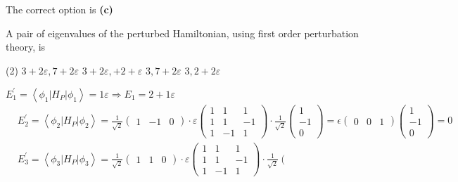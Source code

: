 \begin{enumerate}
\begin{answer}
		The correct option is \textbf{(c)}
	\end{answer}
	\begin{minipage}{\textwidth}
		\item A pair of eigenvalues of the perturbed Hamiltonian, using first order perturbation theory, is
	\end{minipage}
	\begin{tasks}(2)
		\task[\textbf{A.}]$3+2 \varepsilon, 7+2 \varepsilon$
		\task[\textbf{B.}]$3+2 \varepsilon,+2+\varepsilon$
		\task[\textbf{C.}]$3,7+2 \varepsilon$
		\task[\textbf{D.}]$3,2+2 \varepsilon$
	\end{tasks}
	\begin{answer}
		$E_{1}^{\prime}=\left\langle\phi_{1}\left|H_{P}\right| \phi_{1}\right\rangle=1 \varepsilon \Rightarrow E_{1}=2+1 \varepsilon$
		$$
		\begin{aligned}
		&E_{2}^{\prime}=\left\langle\phi_{2}\left|H_{P}\right| \phi_{2}\right\rangle=\frac{1}{\sqrt{2}}\left(\begin{array}{lll}
		1 & -1 & 0
		\end{array}\right) \cdot \varepsilon\left(\begin{array}{ccc}
		1 & 1 & 1 \\
		1 & 1 & -1 \\
		1 & -1 & 1
		\end{array}\right) \cdot \frac{1}{\sqrt{2}}\left(\begin{array}{c}
		1 \\
		-1 \\
		0
		\end{array}\right)=\epsilon\left(\begin{array}{lll}
		0 & 0 & 1
		\end{array}\right)\left(\begin{array}{c}
		1 \\
		-1 \\
		0
		\end{array}\right)=0 \\
		&E_{3}^{\prime}=\left\langle\phi_{3}\left|H_{P}\right| \phi_{3}\right\rangle=\frac{1}{\sqrt{2}}\left(\begin{array}{lll}
		1 & 1 & 0
		\end{array}\right) \cdot \varepsilon\left(\begin{array}{ccc}
		1 & 1 & 1 \\
		1 & 1 & -1 \\
		1 & -1 & 1
		\end{array}\right) \cdot \frac{1}{\sqrt{2}}\left(\begin{array}{l}

\end{array}
\end{aligned}$$
\end{answer}
\end{enumerate}
